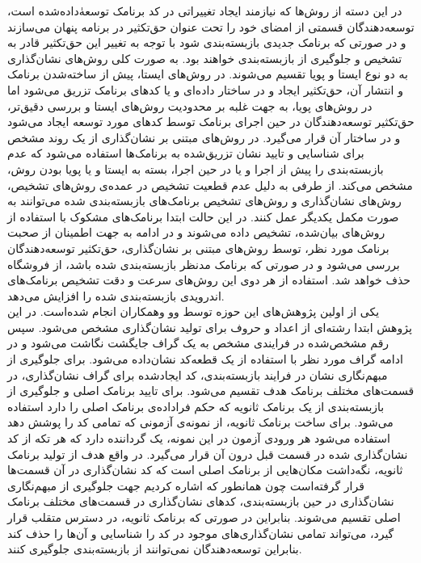 در این دسته از روش‌ها که نیازمند ایجاد تغییراتی در کد برنامک توسعه‌ٰداده‌شده است، توسعه‌دهندگان قسمتی از امضا‌ی خود را تحت عنوان حق‌تکثیر در برنامه پنهان می‌سازند و در صورتی که برنامک‌ جدیدی بازبسته‌بندی شود با توجه به تغییر این حق‌تکثیر قادر به تشخیص و جلوگیری از بازبسته‌بندی خواهند بود. به صورت کلی روش‌های نشان‌گذاری به دو نوع ایستا و پویا تقسیم می‌شوند. در روش‌های ایستا، پیش از ساخته‌‌شدن برنامک و انتشار آن، حق‌تکثیر ایجاد و در ساختار داده‌ای و یا کد‌های برنامک تزریق می‌شود اما در روش‌های پویا، به جهت غلبه بر محدودیت روش‌های ایستا و بررسی دقیق‌تر،‌ حق‌تکثیر توسعه‌دهندگان در حین اجرای برنامک توسط کد‌های مورد توسعه ایجاد می‌شود و در ساختار آن قرار می‌گیرد. در روش‌های مبتنی بر نشان‌گذاری از یک روند مشخص برای شناسایی و تایید نشان تزریق‌شده به برنامک‌ها استفاده می‌شود که عدم بازبسته‌بندی را پیش از اجرا و یا در حین اجرا، بسته به ایستا و یا پویا بودن روش، مشخص می‌کند. از طرفی به دلیل عدم قطعیت تشخیص در عمده‌ی روش‌های تشخیص، روش‌های نشان‌گذاری و روش‌های تشخیص برنامک‌‌های بازبسته‌بندی شده می‌توانند به صورت مکمل یکدیگر عمل کنند.  در این حالت ابتدا برنامک‌های مشکوک با استفاده از روش‌های بیان‌شده، تشخیص داده می‌شوند و در ادامه به جهت اطمینان از صحبت برنامک مورد نظر، توسط روش‌های مبتنی بر نشان‌گذاری، حق‌تکثیر توسعه‌دهندگان بررسی می‌شود و در صورتی که برنامک مدنظر بازبسته‌بندی شده باشد، از فروشگاه حذف خواهد شد. استفاده از هر دوی این روش‌های سرعت و دقت تشخیص برنامک‌های اندرویدی بازبسته‌بندی شده را افزایش می‌دهد.
\\
یکی از اولین پژوهش‌های این حوزه توسط وو وهمکاران انجام شده‌است. در این پژوهش ابتدا رشته‌ای از اعداد و حروف برای تولید نشان‌گذاری مشخص می‌شود. سپس رقم مشخص‌شده در فرایندی مشخص به یک گراف جایگشت نگاشت می‌شود و در ادامه گراف مورد نظر با استفاده از یک قطعه‌کد نشان‌داده می‌شود. برای جلوگیری از مبهم‌نگاری نشان در فرایند بازبسته‌بندی، کد ایجاد‌شده برای گراف‌ نشان‌گذاری، در قسمت‌های مختلف برنامک هدف تقسیم می‌شود. برای تایید برنامک اصلی و جلوگیری از بازبسته‌بندی از یک برنامک ثانویه که حکم فراداده‌ی برنامک اصلی را دارد استفاده می‌شود. برای ساخت برنامک ثانویه، از نمونه‌ی آزمونی که تمامی کد را پوشش دهد استفاده می‌شود هر ورودی آزمون در این نمونه، یک گرداننده دارد که هر تکه از کد نشان‌گذاری شده در قسمت قبل درون آن قرار می‌گیرد. در واقع هدف از تولید برنامک ثانویه، نگه‌داشت مکان‌هایی از برنامک اصلی است که کد نشان‌گذاری در آن قسمت‌ها قرار گرفته‌است چون همانطور که اشاره کردیم جهت جلوگیری از مبهم‌نگاری نشان‌گذاری در حین بازبسته‌بندی، کد‌های نشان‌گذاری در قسمت‌های مختلف برنامک اصلی تقسیم می‌شوند. بنابراین در صورتی که برنامک ثانویه، در دسترس متقلب قرار گیرد، می‌تواند تمامی نشان‌گذاری‌های موجود در کد را شناسایی و آن‌ها را حذف کند بنابراین توسعه‌دهندگان نمی‌توانند از بازبسته‌بندی جلوگیری کنند.\\

